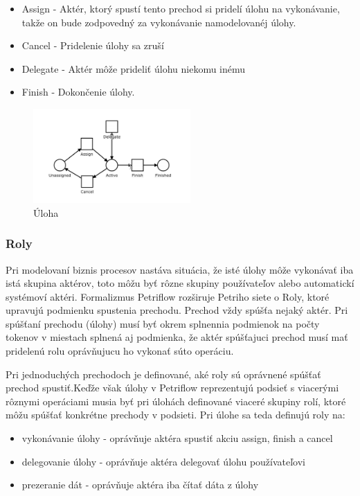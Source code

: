 \begin{itemize}
\item Assign - Aktér, ktorý spustí tento prechod si pridelí úlohu na vykonávanie, takže on bude zodpovedný za vykonávanie namodelovanéj úlohy.
\item Cancel - Pridelenie úlohy sa zruší
\item Delegate - Aktér môže prideliť úlohu niekomu inému
\item Finish - Dokončenie úlohy. 
\end{itemize}


\begin{figure}[!htbp]
\centering
\includegraphics[width=6cm]{img/pn_task.png}
\caption{Úloha}
\label{pn_task}
\end{figure}


\subsubsection{Roly}
Pri modelovaní biznis procesov nastáva situácia, že isté úlohy môže vykonávať iba istá skupina aktérov, toto môžu byť rôzne skupiny používateľov alebo automatickí systémoví aktéri.  Formalizmus Petriflow rozširuje Petriho siete o Roly, ktoré upravujú podmienku spustenia prechodu. Prechod vždy spúšťa nejaký aktér. Pri spúšťaní prechodu (úlohy) musí byť okrem splnennia podmienok na počty tokenov v miestach splnená aj podmienka, že aktér spúšťajuci prechod musí mať pridelenú rolu oprávňujucu ho vykonať súto operáciu. 

Pri jednoduchých prechodoch je definované, aké roly sú oprávnené spúšťať prechod spustiť.Keďže však úlohy v Petriflow reprezentujú podsieť s viacerými rôznymi operáciami musia byť pri úlohách definované viaceré skupiny rolí, ktoré môžu spúšťať konkrétne prechody v podsieti. Pri úlohe sa teda definujú roly na:
\begin{itemize}
\item vykonávanie úlohy - oprávňuje aktéra spustiť akciu assign, finish a cancel
\item delegovanie úlohy - oprávňuje aktéra delegovať úlohu používateľovi
\item prezeranie dát - oprávňuje aktéra  iba čítať dáta z úlohy
\end{itemize}

